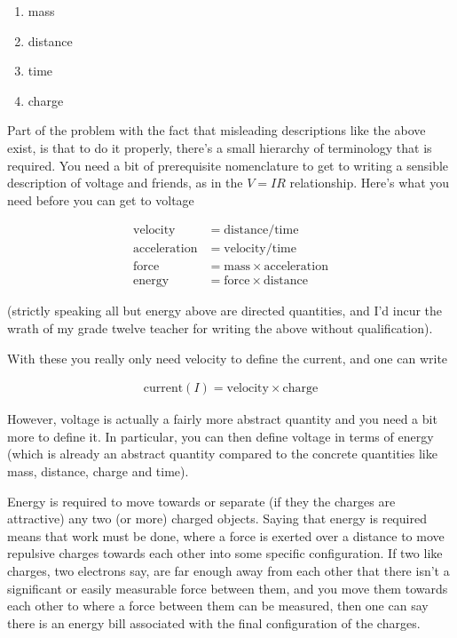 \documentclass{article}
\begin{document}
\begin{enumerate}
\item mass
\item distance
\item time
\item charge
\end{enumerate}

Part of the problem with the fact that misleading descriptions like the above exist, is that to do it
properly, there's a small hierarchy of terminology that is required.  You need a bit
of prerequisite nomenclature to get to writing a sensible description of voltage and friends, as in
the $V = I R$ relationship.  Here's what you need 
before you can get to voltage

\begin{align*}
\text{velocity} &= \text{distance}/ \text{time} \\
\text{acceleration} &= \text{velocity} / \text{time} \\
\text{force} &= \text{mass} \times \text{acceleration} \\
\text{energy} &= \text{force} \times \text{distance}
\end{align*}

(strictly speaking all but energy above are directed quantities, and I'd incur the wrath of my grade twelve teacher for
 writing the above without qualification).

With these you really only need velocity to define the current, and one can write

\begin{align*}
\text{current} (I) = \text{velocity} \times \text{charge}
\end{align*}

However, voltage is actually a fairly more abstract quantity and you need a bit more to define it.
In particular, you can then define voltage in terms of energy (which is already an abstract quantity compared to
the concrete quantities like mass, distance, charge and time).

Energy is required 
to move towards or separate (if they the charges are attractive) any two (or more) charged objects.
Saying that energy is required means that work must be done, where a force is exerted over a distance to move repulsive
charges towards each other into some specific configuration.  If two like charges, two electrons say, are far enough away
from each other that there isn't a significant or easily measurable force between them, and you move them towards each other
to where a force between them can be measured, then one can say there is an energy bill associated with the final configuration
of the charges.
\end{document}
